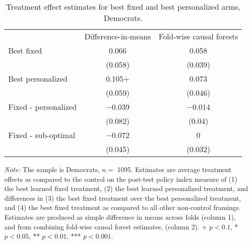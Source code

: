 \begin{table*}

\caption{\label{tab:unnamed-chunk-21}Treatment effect estimates for best fixed and best personalized arms, Democrats. \label{tab:best_framing_democrats}}
\centering
\begin{threeparttable}
\begin{tabular}[t]{lcc}
\toprule
 & Difference-in-means & Fold-wise causal forests\\
\cmidrule(lr){2-2} \cmidrule(lr){3-3}
Best fixed & \num{0.066} & \num{0.058}\\
 & (\num{0.058}) & (\num{0.039})\\
\addlinespace
Best personalized & \num{0.105}+ & \num{0.073}\\
 & (\num{0.059}) & (\num{0.046})\\
\cmidrule(lr){2-2} \cmidrule(lr){3-3}
\addlinespace
Fixed - personalized & \num{-0.039} & \num{-0.014}\\
 & (\num{0.082}) & (\num{0.04})\\
\addlinespace
Fixed - sub-optimal & \num{-0.072} & \num{0}\\
 & (\num{0.045}) & (\num{0.032})\\
\bottomrule
\end{tabular}
\begin{tablenotes}
\item \footnotesize \textit{Note:} The sample is Democrats, $n = $ \num{1095}. Estimates are average treatment effects as compared to the control on the post-test policy index measure of (1) the best learned fixed treatment, (2) the best learned personalized treatment, and differences in (3) the best fixed treatment over the best personalized treatment, and (4) the best fixed treatment as compared to all other non-control framings. Estimates are produced as simple difference in means across folds (column 1), and from combining fold-wise causal forest estimates, (column 2). + $p < 0.1$, * $p < 0.05$, ** $p < 0.01$, *** $p < 0.001$.
\end{tablenotes}
\end{threeparttable}
\end{table*}
